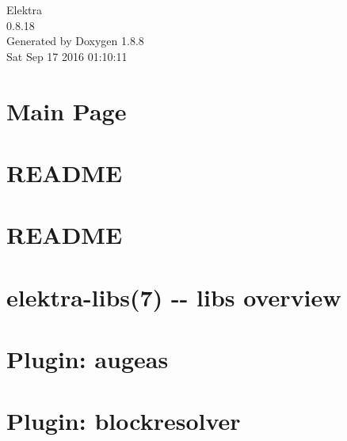 \documentclass[twoside]{book}
\newcommand{\+}{\discretionary{\mbox{\scriptsize$\hookleftarrow$}}{}{}}
\newcommand{\clearemptydoublepage}{%
  \newpage{\pagestyle{empty}\cleardoublepage}%
}
\begin{document}
\hypersetup{pageanchor=false,
             bookmarks=true,
             bookmarksnumbered=true,
             pdfencoding=unicode
            }
\begin{titlepage}
\vspace*{7cm}
\begin{center}%
{\Large Elektra \\[1ex]\large 0.\+8.\+18 }\\
\vspace*{1cm}
{\large Generated by Doxygen 1.8.8}\\
\vspace*{0.5cm}
{\small Sat Sep 17 2016 01:10:11}\\
\end{center}
\end{titlepage}
\clearemptydoublepage
\tableofcontents
\clearemptydoublepage
{}
\hypersetup{pageanchor=true}

\chapter{Main Page}
\label{index}\hypertarget{index}{}
\chapter{R\+E\+A\+D\+M\+E}
\label{md_src_libs_elektra_README}
\hypertarget{md_src_libs_elektra_README}{}

\chapter{R\+E\+A\+D\+M\+E}
\label{md_src_libs_getenv_README}
\hypertarget{md_src_libs_getenv_README}{}

\chapter{elektra-\/libs(7) -\/-\/ libs overview}
\label{md_src_libs_README}
\hypertarget{md_src_libs_README}{}

\chapter{Plugin\+: augeas}
\label{md_src_plugins_augeas_README}
\hypertarget{md_src_plugins_augeas_README}{}

\chapter{Plugin\+: blockresolver}
\label{md_src_plugins_blockresolver_README}
\hypertarget{md_src_plugins_blockresolver_README}{}

\end{document}
